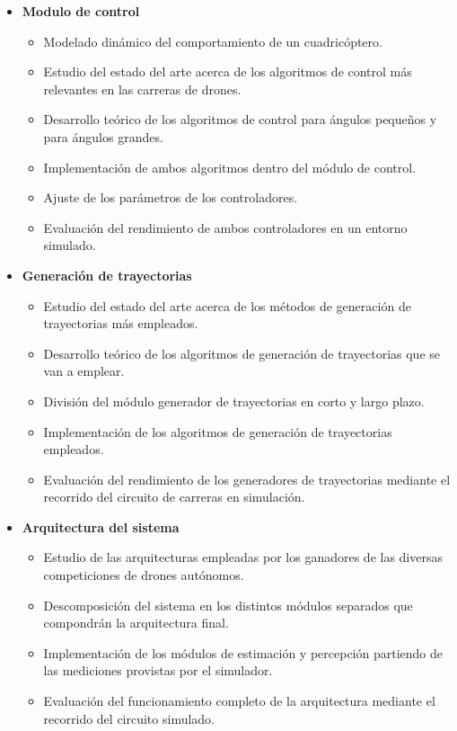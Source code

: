 \begin{itemize}
	\item \textbf{Modulo de control}	
	\begin{itemize}
		\item Modelado dinámico del comportamiento de un cuadricóptero.
		\item Estudio del estado del arte acerca de los algoritmos de control más relevantes en las carreras de drones.
		\item Desarrollo teórico de los algoritmos de control para ángulos pequeños
		y para ángulos grandes.
		\item Implementación de ambos algoritmos dentro del módulo de control.
		\item Ajuste de los parámetros de los controladores.
		\item Evaluación del rendimiento de ambos controladores en un entorno simulado.
				
	\end{itemize}

	\item \textbf{Generación de trayectorias}	
	\begin{itemize}
		\item Estudio del estado del arte acerca de los métodos de generación de trayectorias más empleados.
		\item Desarrollo teórico de los algoritmos de generación de trayectorias que se van a emplear.
		\item División del módulo generador de trayectorias en corto y largo plazo.
		\item Implementación de los algoritmos de generación de trayectorias empleados.
		\item Evaluación del rendimiento de los generadores de trayectorias mediante el recorrido del circuito de carreras en simulación.
	\end{itemize}

	\item \textbf{Arquitectura del sistema}	
	\begin{itemize}
		\item Estudio de las arquitecturas empleadas por los ganadores de las diversas competiciones de drones autónomos.
		\item Descomposición del sistema en los distintos módulos separados que compondrán la arquitectura final.
		\item Implementación de los módulos de estimación y percepción partiendo de las mediciones provistas por el simulador.
		\item Evaluación del funcionamiento completo de la arquitectura mediante el recorrido del circuito simulado. 
		
	\end{itemize}
	
	
\end{itemize}